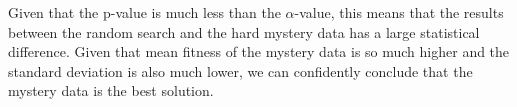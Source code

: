 \documentclass{article}
\begin{document}
Given that the p-value is much less than the $\alpha$-value, 
this means that the results between the random search and the hard mystery data
has a large statistical difference. Given that mean fitness of the mystery data is so much higher
and the standard deviation is also much lower, we can confidently conclude that the mystery
data is the best solution.
\end{document}
